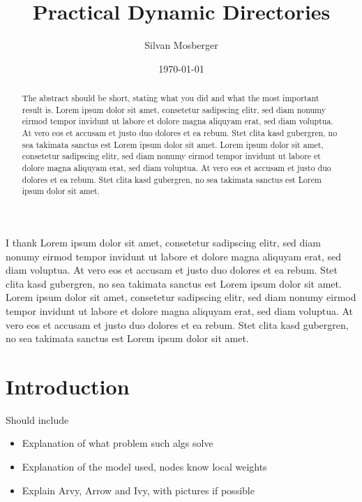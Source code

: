 \documentclass[a4paper, oneside]{discothesis}
\title{Practical Dynamic Directories}
\author{Silvan Mosberger}
\institute{Distributed Computing Group \\[2pt]
Computer Engineering and Networks Laboratory \\[2pt]
ETH Zürich}
\date{\today}
\begin{document}
\frontmatter %
\maketitle

\cleardoublepage

\begin{acknowledgements}
I thank Lorem ipsum dolor sit amet, consetetur sadipscing elitr, sed diam nonumy eirmod tempor invidunt ut labore et dolore magna aliquyam erat, sed diam voluptua. At vero eos et accusam et justo duo dolores et ea rebum. Stet clita kasd gubergren, no sea takimata sanctus est Lorem ipsum dolor sit amet. Lorem ipsum dolor sit amet, consetetur sadipscing elitr, sed diam nonumy eirmod tempor invidunt ut labore et dolore magna aliquyam erat, sed diam voluptua. At vero eos et accusam et justo duo dolores et ea rebum. Stet clita kasd gubergren, no sea takimata sanctus est Lorem ipsum dolor sit amet.
\end{acknowledgements}


\begin{abstract}
The abstract should be short, stating what you did and what the most important result is.
Lorem ipsum dolor sit amet, consetetur sadipscing elitr, sed diam nonumy eirmod tempor invidunt ut labore et dolore magna aliquyam erat, sed diam voluptua. At vero eos et accusam et justo duo dolores et ea rebum. Stet clita kasd gubergren, no sea takimata sanctus est Lorem ipsum dolor sit amet. Lorem ipsum dolor sit amet, consetetur sadipscing elitr, sed diam nonumy eirmod tempor invidunt ut labore et dolore magna aliquyam erat, sed diam voluptua. At vero eos et accusam et justo duo dolores et ea rebum. Stet clita kasd gubergren, no sea takimata sanctus est Lorem ipsum dolor sit amet.
\end{abstract}

\tableofcontents

\mainmatter

\chapter{Introduction}

Should include
\begin{itemize}
\item Explanation of what problem such algs solve
\item Explanation of the model used, nodes know local weights
\item Explain Arvy, Arrow and Ivy, with pictures if possible
\end{itemize}
\end{document}

